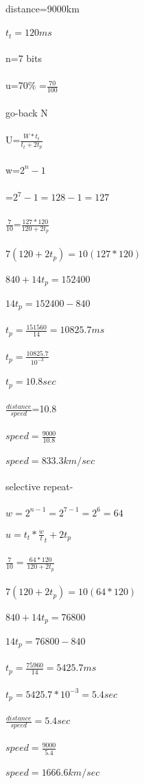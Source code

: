 \documentclass[a4paper,8pt]{article}
\begin{document}
distance=9000km\\\\
$t_{t}=120ms$\\\\
n=7 bits\\\\
u=70\%  =$\frac{70}{100}$\\\\
go-back N\\\\
U=$\frac{W*t_{t}}{t_{t}+2t_{p}}$\\\\
w=$2^{n}-1$\\\\
=$2^{7}-1  =128-1=127$\\\\
$\frac{7}{10}$=$\frac{127*120}{120+2t_{p}}$\\\\
$7(120+2t_{p})=10(127*120)$\\\\
$840+14t_{p}=152400$\\\\
$14t_{p}=152400-840$\\\\
$t_{p}=\frac{151560}{14}=10825.7 ms$\\\\
$t_{p}=\frac{10825.7}{10^{-3}}$\\\\
$t_{p}=10.8 sec$\\\\
$\frac{distance}{speed}$=10.8\\\\
$speed=\frac{9000}{10.8}$\\\\
$speed=833.3 km/sec$\\\\
selective repeat-\\\\
$w=2^{n-1}=2^{7-1}=2^{6}=64$\\\\
$u=t_{t}*\frac{w}{t}_{t}+2t_{p}$\\\\
$\frac{7}{10}=\frac{64*120}{120+2t_{p}}$\\\\
$7(120+2t_{p})=10(64*120)$\\\\
$840+14t_{p}=76800$\\\\
$14t_{p}=76800-840$\\\\
$t_{p}=\frac{75960}{14} =5425.7 ms$\\\\
$t_{p}=5425.7*10^{-3}=5.4 sec$\\\\
$\frac{distance}{speed}=5.4 sec$\\\\
$speed=\frac{9000}{5.4}$\\\\
$speed=1666.6 km/sec$\\\\
\end{document}
